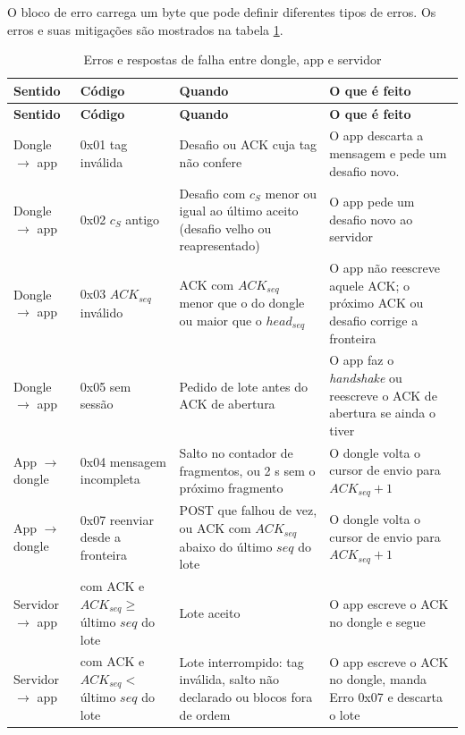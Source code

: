 \documentclass[
	12pt,
	article,			%
	oneside,
	a4paper,
	english,
	brazil				%
	]{abntex2}
\begin{document}
O bloco de erro carrega um byte que pode definir diferentes tipos de erros. Os erros e suas mitigações são mostrados na tabela \ref{tab:erros-bloco}.

\begin{longtable}{|>{\raggedright\arraybackslash}p{}|>{\raggedright\arraybackslash}p{}|>{\raggedright\arraybackslash}p{}|>{\raggedright\arraybackslash}p{}|}
	\caption{Erros e respostas de falha entre dongle, app e servidor}
	\label{tab:erros-bloco} \\
	\hline
	\textbf{Sentido} & \textbf{Código} & \textbf{Quando} & \textbf{O que é feito} \\
	\hline
	\endfirsthead
	\hline
	\textbf{Sentido} & \textbf{Código} & \textbf{Quando} & \textbf{O que é feito} \\
	\hline
	\endhead
	\hline
	\endfoot
	Dongle $\rightarrow$ app & 0x01 tag inválida & Desafio ou ACK cuja tag não confere & O app descarta a mensagem e pede um desafio novo. \\
	\hline
	Dongle $\rightarrow$ app & 0x02 $c_S$ antigo & Desafio com $c_S$ menor ou igual ao último aceito (desafio velho ou reapresentado) & O app pede um desafio novo ao servidor \\
	\hline
	Dongle $\rightarrow$ app & 0x03 $ACK_{seq}$ inválido & ACK com $ACK_{seq}$ menor que o do dongle ou maior que o $head_{seq}$ & O app não reescreve aquele ACK; o próximo ACK ou desafio corrige a fronteira \\
	\hline
	Dongle $\rightarrow$ app & 0x05 sem sessão & Pedido de lote antes do ACK de abertura & O app faz o \textit{handshake} ou reescreve o ACK de abertura se ainda o tiver \\
	\hline
	App $\rightarrow$ dongle & 0x04 mensagem incompleta & Salto no contador de fragmentos, ou 2 s sem o próximo fragmento & O dongle volta o cursor de envio para $ACK_{seq} + 1$ \\
	\hline
	App $\rightarrow$ dongle & 0x07 reenviar desde a fronteira & POST que falhou de vez, ou ACK com $ACK_{seq}$ abaixo do último $seq$ do lote & O dongle volta o cursor de envio para $ACK_{seq} + 1$ \\
	\hline
	Servidor $\rightarrow$ app & 200 com ACK e $ACK_{seq} \geq$ último $seq$ do lote & Lote aceito & O app escreve o ACK no dongle e segue \\
	\hline
	Servidor $\rightarrow$ app & 200 com ACK e $ACK_{seq} <$ último $seq$ do lote & Lote interrompido: tag inválida, salto não declarado ou blocos fora de ordem & O app escreve o ACK no dongle, manda Erro 0x07 e descarta o lote \\

\end{longtable}
\end{document}
